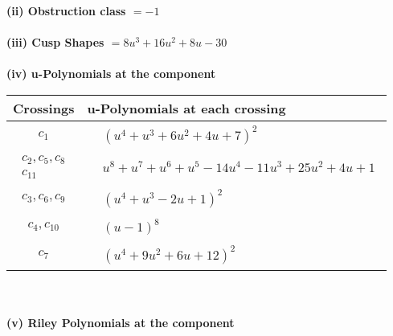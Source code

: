 \documentclass[1p]{elsarticle_modified}
\theoremstyle{definition}
\begin{document}
\flushleft \textbf{(ii) Obstruction class $= -1$}\\~\\
\flushleft \textbf{(iii) Cusp Shapes $= 8 u^3+16 u^2+8 u-30$}\\~\\
\newpage\renewcommand{\arraystretch}{1}
\flushleft \textbf{(iv) u-Polynomials at the component}\newline \\
\begin{tabular}{m{50pt}|m{274pt}}
Crossings & \hspace{64pt}u-Polynomials at each crossing \\
\hline $$\begin{aligned}c_{1}\end{aligned}$$&$\begin{aligned}
&(u^4+u^3+6 u^2+4 u+7)^2
\end{aligned}$\\
\hline $$\begin{aligned}c_{2},c_{5},c_{8}\\c_{11}\end{aligned}$$&$\begin{aligned}
&u^8+u^7+u^6+u^5-14 u^4-11 u^3+25 u^2+4 u+1
\end{aligned}$\\
\hline $$\begin{aligned}c_{3},c_{6},c_{9}\end{aligned}$$&$\begin{aligned}
&(u^4+u^3-2 u+1)^2
\end{aligned}$\\
\hline $$\begin{aligned}c_{4},c_{10}\end{aligned}$$&$\begin{aligned}
&(u-1)^8
\end{aligned}$\\
\hline $$\begin{aligned}c_{7}\end{aligned}$$&$\begin{aligned}
&(u^4+9 u^2+6 u+12)^2
\end{aligned}$\\
\hline
\end{tabular}\\~\\
\newpage\renewcommand{\arraystretch}{1}
\flushleft \textbf{(v) Riley Polynomials at the component}\newline \\
\end{document}

